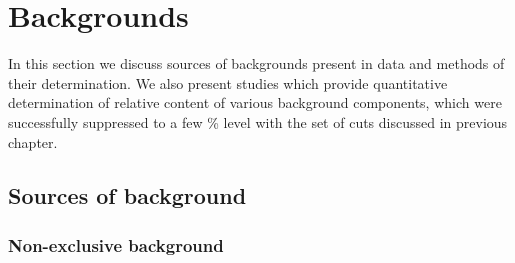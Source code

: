 
\chapter{Backgrounds}\label{chap:backgrounds}

In this section we discuss sources of backgrounds present in data and methods of their determination. We also present studies which provide quantitative determination of relative content of various background components, which were successfully suppressed to a few \% level with the set of cuts discussed in previous chapter.

\section{Sources of background}
\subsection{Non-exclusive background}\label{sec:nonExclBkgd}

